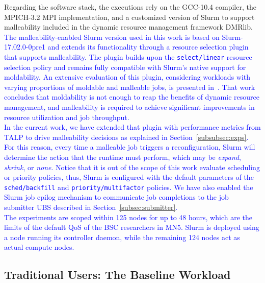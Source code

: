 \documentclass[a4paper,fleqn]{cas-dc}
\newcommand{\review}[1]{\textcolor{blue}{#1}}
\begin{document}
Regarding the software stack, the executions rely on the GCC-10.4 compiler, the MPICH-3.2 MPI implementation, and a customized version of Slurm to support malleability included in the dynamic resource management framework DMRlib. 
\review{The malleability-enabled Slurm version used in this work is based on Slurm-17.02.0-0pre1 and extends its functionality through a resource selection plugin that supports malleability. The plugin builds upon the \texttt{select/linear} resource selection policy and remains fully compatible with Slurm’s native support for moldability. An extensive evaluation of this plugin, considering workloads with varying proportions of moldable and malleable jobs, is presented in~\cite{iserte_dmrlib_2020}.
That work concludes that moldability is not enough to reap the benefits of dynamic resource management, and malleability is required to achieve significant improvements in resource utilization and job throughput.
\\
In the current work, we have extended that plugin with performance metrics from TALP to drive malleability decisions as explained in Section~\ref{subsubsec:exps}.
For this reason, every time a malleable job triggers a reconfiguration, Slurm will determine the action that the runtime must perform, which may be \textit{expand}, \textit{shrink}, or \textit{none}. 
Notice that it is out of the scope of this work evaluate scheduling or priority policies, thus, Slurm is configured with \review{the default parameters of the} \texttt{sched/backfill} and \texttt{priority/multifactor} policies.
We have also enabled the Slurm job epilog mechanism to communicate job completions to the job submitter UBS described in Section~\ref{subsec:submitter}.
\\
The experiments are scoped within 125 nodes for up to 48 hours, which are the limits of the default QoS of the BSC researchers in MN5.
Slurm is deployed using a node running its controller daemon, while the remaining 124 nodes act as actual compute nodes.
}

\subsection{Traditional Users: The Baseline Workload}
\end{document}
